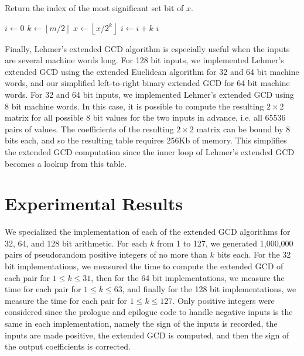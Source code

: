 \documentclass{ucalgthes1}
\theoremstyle{definition}
\newcommand{\floor}[1]{\left\lfloor #1 \right\rfloor}
\begin{document}
\begin{algorithm}[htb]
\caption{Return the index of the most significant set bit of $x$.}
\label{alg:msb}
\begin{algorithmic}[1]
\State $i \gets 0$
\State $k \gets \floor{m/2}$ 
		\State $x \gets \floor{x / 2^k}$
		\State $i \gets i + k$
	\EndIf
\EndWhile
\State \Return $i$
\end{algorithmic}
\end{algorithm}

Finally, Lehmer's extended GCD algorithm is especially useful when the inputs are several machine words long.  For 128 bit inputs, we implemented Lehmer's extended GCD using the extended Euclidean algorithm for 32 and 64 bit machine words, and our simplified left-to-right binary extended GCD for 64 bit machine words.  For 32 and 64 bit inputs, we implemented Lehmer's extended GCD using 8 bit machine words.  In this case, it is possible to compute the resulting $2 \times 2$ matrix for all possible 8 bit values for the two inputs in advance, i.e. all 65536 pairs of values.  The coefficients of the resulting $2 \times 2$ matrix can be bound by 8 bits each, and so the resulting table requires 256Kb of memory. This simplifies the extended GCD computation since the inner loop of Lehmer's extended GCD becomes a lookup from this table.

\section{Experimental Results}
\label{sec:gcdResults}

We specialized the implementation of each of the extended GCD algorithms for 32, 64, and 128 bit arithmetic.  For each $k$ from 1 to 127, we generated 1,000,000 pairs of pseudorandom positive integers of no more than $k$ bits each.  For the 32 bit implementations, we measured the time to compute the extended GCD of each pair for $1 \le k \le 31$, then for the 64 bit implementations, we measure the time for each pair for $1 \le k \le 63$, and finally for the 128 bit implementations, we measure the time for each pair for $1 \le k \le 127$.  Only positive integers were considered since the prologue and epilogue code to handle negative inputs is the same in each implementation, namely the sign of the inputs is recorded, the inputs are made positive, the extended GCD is computed, and then the sign of the output coefficients is corrected.  
\end{document}
